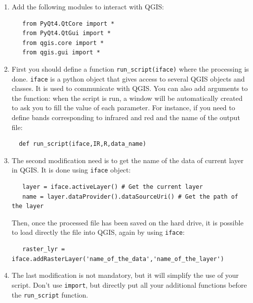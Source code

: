 \documentclass[a4paper,11pt,DIV=18]{scrartcl}
\begin{document}
\begin{enumerate}
\item Add the following modules to interact with QGIS:

\begin{verbatim}
   from PyQt4.QtCore import *
   from PyQt4.QtGui import *
   from qgis.core import *
   from qgis.gui import *
\end{verbatim}

\item First you  should define  a function  \texttt{run\_script(iface)} where  the
processing is done.  \texttt{iface} is a  python object that gives access to
several QGIS objects  and classes.  It is used  to communicate with
QGIS. You can  also add arguments to the function:  when the script
is run, a  window will be automatically created to  ask you to fill
the value  of each parameter. For  instance, if you need  to define
bands corresponding to infrared and red  and the name of the output
file:

\begin{verbatim}
  def run_script(iface,IR,R,data_name)
\end{verbatim}

\item The  second modification  need is to  get the name  of the  data of
current layer in QGIS. It is done using \texttt{iface} object:

\begin{verbatim}
   layer = iface.activeLayer() # Get the current layer
   name = layer.dataProvider().dataSourceUri() # Get the path of the layer
\end{verbatim}

Then, once the processed file has  been saved on the hard drive, it
is possible  to load directly  the file  into QGIS, again  by using
\texttt{iface}:

\begin{verbatim}
   raster_lyr = iface.addRasterLayer('name_of_the_data','name_of_the_layer')
\end{verbatim}

\item The  last modification is not  mandatory, but it will  simplify the
use of  your script. Don't  use \texttt{import},  but directly put  all your
additional functions before the \texttt{run\_script} function.
\end{enumerate}
\end{document}
